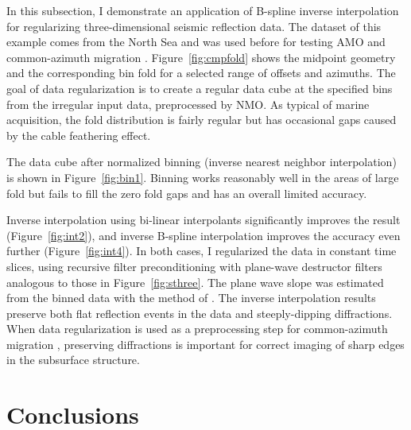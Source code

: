 In this subsection, I demonstrate an application of B-spline inverse
interpolation for regularizing three-dimensional seismic reflection
data. The dataset of this example comes from the North Sea and was
used before for testing AMO \cite{Biondi.geo.amo98} and common-azimuth
migration \cite{Biondi.sep.93.1}. Figure~\ref{fig:cmpfold} shows the
midpoint geometry and the corresponding bin fold for a selected range
of offsets and azimuths. The goal of data regularization is to create
a regular data cube at the specified bins from the irregular input
data, preprocessed by NMO. As typical of marine acquisition, the fold
distribution is fairly regular but has occasional gaps caused by the
cable feathering effect.


The data cube after normalized binning (inverse nearest neighbor
interpolation) is shown in Figure~\ref{fig:bin1}.  Binning works
reasonably well in the areas of large fold but fails to fill the zero
fold gaps and has an overall limited accuracy.


Inverse interpolation using bi-linear interpolants significantly
improves the result (Figure~\ref{fig:int2}), and inverse B-spline
interpolation improves the accuracy even further
(Figure~\ref{fig:int4}). In both cases, I regularized the data in
constant time slices, using recursive filter preconditioning with
plane-wave destructor filters analogous to those in
Figure~\ref{fig:sthree}. The plane wave slope was estimated from the
binned data with the method of .  The
inverse interpolation results preserve both flat reflection events in
the data and steeply-dipping diffractions. When data regularization is
used as a preprocessing step for common-azimuth migration
\cite{Biondi.geo.comaz96}, preserving diffractions is important for
correct imaging of sharp edges in the subsurface structure.



\section{Conclusions}

